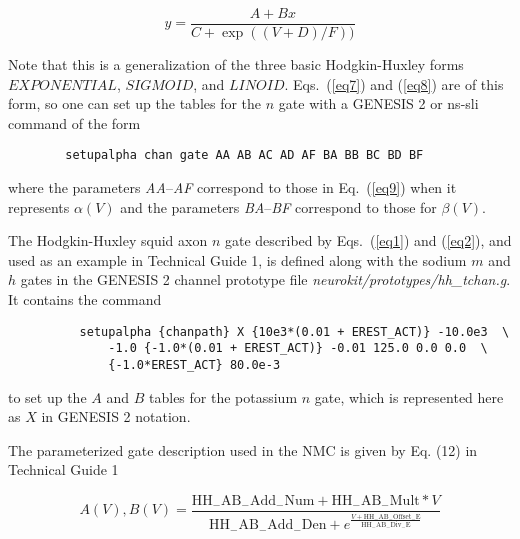 \documentclass[12pt]{article}
\begin{document}
\begin{equation}
y = \frac{A + B x}{C + \exp((V + D) / F))}
\label{eq9}
\end{equation}

Note that this is a generalization of the three basic Hodgkin-Huxley forms
$EXPONENTIAL$, $SIGMOID$, and $LINOID$.  Eqs.~(\ref{eq7}) and (\ref{eq8})
are of this form, so one can set up the tables for the $n$ gate with a
GENESIS 2 or ns-sli command of the form

\begin{verbatim}
        setupalpha chan gate AA AB AC AD AF BA BB BC BD BF
\end{verbatim}

where the parameters {\em AA\/}--{\em AF\/} correspond to those in
Eq.~(\ref{eq9}) when it represents $\alpha(V)$ and the parameters {\em
BA\/}--{\em BF\/} correspond to those for $\beta(V)$.  

The Hodgkin-Huxley squid axon $n$ gate described by Eqs.~(\ref{eq1}) and
(\ref{eq2}), and used as an example in Technical Guide 1, is defined along
with the sodium $m$ and $h$ gates in the GENESIS 2 channel prototype file
{\em neurokit/prototypes/hh\_tchan.g}.  It contains the command

\begin{verbatim}
          setupalpha {chanpath} X {10e3*(0.01 + EREST_ACT)} -10.0e3  \
              -1.0 {-1.0*(0.01 + EREST_ACT)} -0.01 125.0 0.0 0.0  \
              {-1.0*EREST_ACT} 80.0e-3
\end{verbatim}

to set up the $A$ and $B$ tables for the potassium $n$ gate, which is
represented here as $X$ in GENESIS 2 notation.

The parameterized gate description used in the NMC is given by Eq. (12) in
Technical Guide 1


\begin{equation}
  \label{eq10}
  A(V), B(V) =  \frac{ 
 \mathrm{HH_{-}AB_{-}Add_{-}Num} +  \mathrm{HH_{-}AB_{-}Mult} *  V }
   { \mathrm{HH_{-}AB_{-}Add_{-}Den} +   e ^ {\frac { V + 
  \mathrm{HH_{-}AB_{-}Offset_{-}E} }{ \mathrm{HH_{-}AB_{-}Div_{-}E}}}}
\end{equation}
\end{document}
